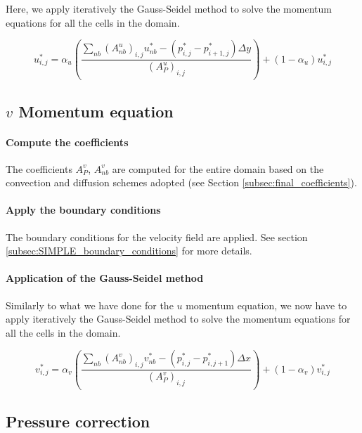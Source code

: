 Here, we apply iteratively the Gauss-Seidel method to solve the momentum equations for all the cells in the domain.

\begin{equation}
    u_{i,j}^* = \alpha_u \left( \frac{\sum_{nb} (A_{nb}^u)_{i,j} u_{nb}^* - (p_{i,j}^* - p_{i+1,j}^*) \Delta y}{(A_P^u)_{i,j}} \right) + (1 - \alpha_u) u_{i,j}^*
\end{equation}


\subsection{$v$ Momentum equation}

\paragraph{Compute the coefficients}

The coefficients $A_P^v$, $A_{nb}^v$ are computed for the entire domain based on the convection and diffusion schemes adopted (see Section \ref{subsec:final_coefficients}).

\paragraph{Apply the boundary conditions}

The boundary conditions for the velocity field are applied. See section \ref{subsec:SIMPLE_boundary_conditions} for more details.

\paragraph{Application of the Gauss-Seidel method}

Similarly to what we have done for the $u$ momentum equation, we now have to apply iteratively the Gauss-Seidel method to solve the momentum equations for all the cells in the domain.

\begin{equation}
    v_{i,j}^* = \alpha_v \left( \frac{\sum_{nb} (A_{nb}^v)_{i,j} v_{nb}^* - (p_{i,j}^* - p_{i,j+1}^*) \Delta x}{(A_P^v)_{i,j}} \right) + (1 - \alpha_v) v_{i,j}^*
\end{equation}


\subsection{Pressure correction}

